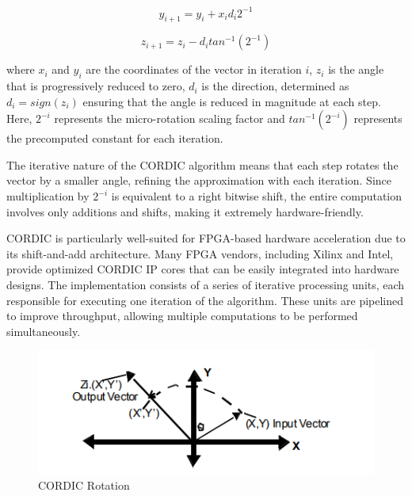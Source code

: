 \begin{equation}
	\label{eq:equation_3}
	y_{i+1} = y_{i} + x_{i}d_{i}2^{-1}
\end{equation}

\begin{equation}
	\label{eq:equation_3}
	z_{i+1} = z_{i} - d_{i}tan^{-1}(2^{-1})
\end{equation}

where \( x_{i} \) and \( y_{i} \) are the coordinates of the vector in iteration \( i \), \( z_{i} \) is the angle that is progressively reduced to zero, \( d_{i} \) is the direction, determined as \( d_{i} = sign(z_{i}) \) ensuring that the angle is reduced in magnitude at each step. Here, \( 2^{-i} \) represents the micro-rotation scaling factor and \( tan^{-1}(2^{-i}) \) represents the precomputed constant for each iteration.

The iterative nature of the CORDIC algorithm means that each step rotates the vector by a smaller angle, refining the approximation with each iteration. Since multiplication by \( 2^{-i} \) is equivalent to a right bitwise shift, the entire computation involves only additions and shifts, making it extremely hardware-friendly.

CORDIC is particularly well-suited for FPGA-based hardware acceleration due to its shift-and-add architecture. Many FPGA vendors, including Xilinx and Intel, provide optimized CORDIC IP cores that can be easily integrated into hardware designs\cite{cordic-2}. The implementation consists of a series of iterative processing units, each responsible for executing one iteration of the algorithm. These units are pipelined to improve throughput, allowing multiple computations to be performed simultaneously.

\begin{figure}[H]
	\centerline{\includegraphics[scale = 0.80]{Figures/AMD_1.png}}
	\caption{CORDIC Rotation}
	\label{cordic rotation}
\end{figure}


